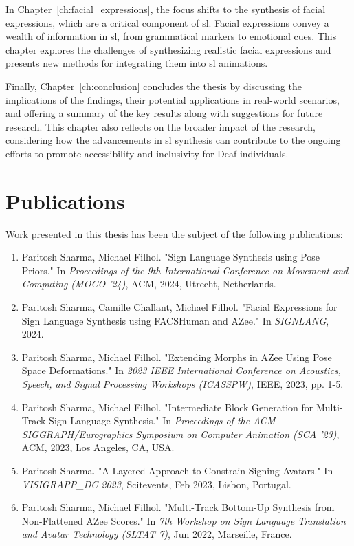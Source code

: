 \documentclass[../../main.tex]{subfiles}
\begin{document}
In Chapter~\ref{ch:facial_expressions}, the focus shifts to the synthesis of facial expressions, which are a critical component of \gls{sl}. Facial expressions convey a wealth of information in \gls{sl}, from grammatical markers to emotional cues. This chapter explores the challenges of synthesizing realistic facial expressions and presents new methods for integrating them into \gls{sl} animations.

Finally, Chapter~\ref{ch:conclusion} concludes the thesis by discussing the implications of the findings, their potential applications in real-world scenarios, and offering a summary of the key results along with suggestions for future research. This chapter also reflects on the broader impact of the research, considering how the advancements in \gls{sl} synthesis can contribute to the ongoing efforts to promote accessibility and inclusivity for Deaf individuals.

\section{Publications}

Work presented in this thesis has been the subject of the following publications:

\begin{enumerate}
    \item Paritosh Sharma, Michael Filhol. "Sign Language Synthesis using Pose Priors." In \textit{Proceedings of the 9th International Conference on Movement and Computing (MOCO '24)}, ACM, 2024, Utrecht, Netherlands.
    
    \item Paritosh Sharma, Camille Challant, Michael Filhol. "Facial Expressions for Sign Language Synthesis using FACSHuman and AZee." In \textit{SIGNLANG}, 2024.
    
    \item Paritosh Sharma, Michael Filhol. "Extending Morphs in AZee Using Pose Space Deformations." In \textit{2023 IEEE International Conference on Acoustics, Speech, and Signal Processing Workshops (ICASSPW)}, IEEE, 2023, pp. 1-5.
    
    \item Paritosh Sharma, Michael Filhol. "Intermediate Block Generation for Multi-Track Sign Language Synthesis." In \textit{Proceedings of the ACM SIGGRAPH/Eurographics Symposium on Computer Animation (SCA '23)}, ACM, 2023, Los Angeles, CA, USA.
    
    \item Paritosh Sharma. "A Layered Approach to Constrain Signing Avatars." In \textit{VISIGRAPP\_DC 2023}, Scitevents, Feb 2023, Lisbon, Portugal.
    
    \item Paritosh Sharma, Michael Filhol. "Multi-Track Bottom-Up Synthesis from Non-Flattened AZee Scores." In \textit{7th Workshop on Sign Language Translation and Avatar Technology (SLTAT 7)}, Jun 2022, Marseille, France.
\end{enumerate}
\end{document}
